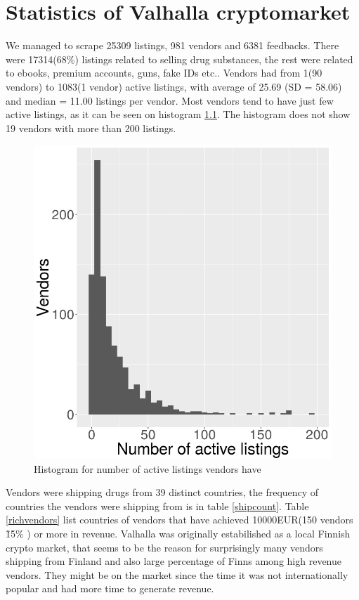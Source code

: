 \documentclass[
  digital, %
  table,   %
  lof,     %
  lot,     %
  oneside
]{fithesis3}
\begin{document}
\chapter{Statistics of Valhalla cryptomarket}
\label{stats}

We managed to scrape 25309 listings, 981 vendors and 6381 feedbacks.
There were 17314(68\%) listings related to selling drug substances, the rest
were related to ebooks, premium accounts, guns, fake IDs etc..
Vendors had from 1(90 vendors) to 1083(1 vendor)
active listings, with average of 25.69 (SD = 58.06)
and median = 11.00 listings per vendor.
Most vendors tend to have just few active listings,
as it can be seen on histogram \ref{listingsxsellers}.
The histogram does not show 19 vendors with more than 200 listings.

\begin{figure}[!htb]
    \centering
    \includegraphics[scale=0.6]{listingsxsellers}
    \centering
    \caption{Histogram for number of active listings vendors have}
    \label{listingsxsellers}
\end{figure}

Vendors were shipping drugs from 39 distinct countries,
the frequency of countries the vendors were shipping from is in table \ref{shipcount}.
Table \ref{richvendors} list countries of vendors that have achieved 10000EUR(150 vendors \~ 15\% ) or more in revenue.
Valhalla was originally estabilished as a local Finnish crypto market,
that seems to be the reason for surprisingly many vendors shipping from Finland and also large percentage
of Finns among high revenue vendors. They might be on the market since
the time it was not internationally popular and had more time to generate revenue.
\end{document}
